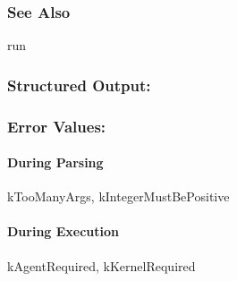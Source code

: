 \subsubsection*{See Also}
 run
\subsubsection*{Structured Output:}
\subsubsection*{Error Values:}
\paragraph*{During Parsing}
 kTooManyArgs, kIntegerMustBePositive
\paragraph*{During Execution}
 kAgentRequired, kKernelRequired
